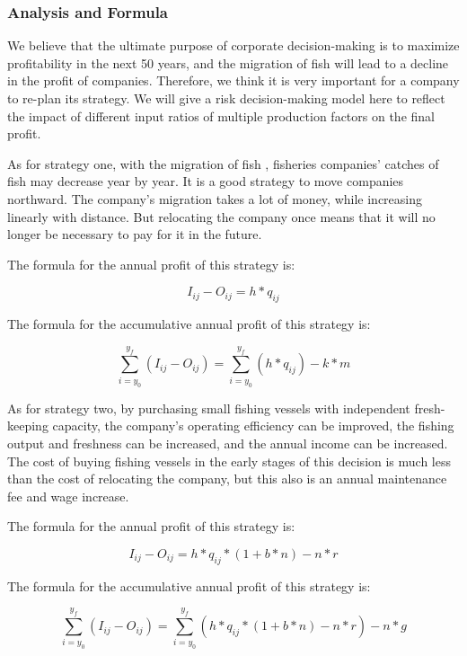 \documentclass{mcmthesis}
\numberwithin{figure}{section}
\numberwithin{table}{section}
\begin{document}
\subsubsection{Analysis and Formula}
We believe that the ultimate purpose of corporate decision-making is to maximize profitability in the next 50 years, and the migration of fish will lead to a decline in the profit of companies. Therefore, we think it is very important for a company to re-plan its strategy. We will give a risk decision-making model here to reflect the impact of different input ratios of multiple production factors on the final profit.

As for strategy one, with the migration of fish , fisheries companies' catches of fish may decrease year by year. It is a good strategy to move companies northward. The company's migration takes a lot of money, while increasing linearly with distance. But relocating the company once means that it will no longer be necessary to pay for it in the future.

The formula for the annual profit of this strategy is:

\begin{equation}\label{1}
  I_{ij} - O_{ij} = h * q_{ij}
  \end{equation}

The formula for the accumulative annual profit of this strategy is:

\begin{equation}\label{2}
  \sum_{i=y_0}^{y_f} (I_{ij} - O_{ij}) = \sum_{i=y_0}^{y_f} (h * q_{ij}) - k*m
  \end{equation}
  
As for strategy two, by purchasing small fishing vessels with independent fresh-keeping capacity, the company's operating efficiency can be improved, the fishing output and freshness can be increased, and the annual income can be increased. The cost of buying fishing vessels in the early stages of this decision is much less than the cost of relocating the company, but this also is an annual maintenance fee and wage increase.

The formula for the annual profit of this strategy is:

\begin{equation}\label{3}
  I_{ij} - O_{ij} = h * q_{ij} * (1+b*n) - n*r
  \end{equation}

The formula for the accumulative annual profit of this strategy is:

\begin{equation}\label{4}
  \sum_{i=y_0}^{y_f} (I_{ij} - O_{ij}) = \sum_{i=y_0}^{y_f} (h * q_{ij}* (1+b*n) - n * r ) - n * g
\end{equation}
  
\end{document}
